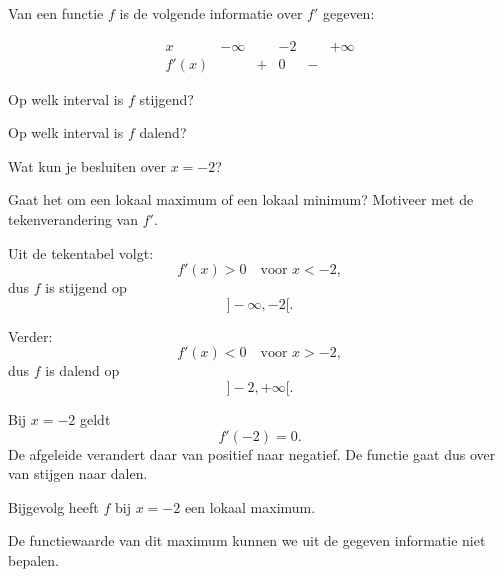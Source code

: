 \documentclass{ximera}
\begin{document}
\begin{oefening}{\oefB\ESS}

Van een functie $f$ is de volgende informatie over $f'$ gegeven:

\[
\begin{array}{c|ccccc}
x      & -\infty &   & -2 &   & +\infty \\ \hline
f'(x)  &         & + & 0  & - &
\end{array}
\]

\begin{question}
Op welk interval is $f$ stijgend?
\end{question}

\begin{question}
Op welk interval is $f$ dalend?
\end{question}

\begin{question}
Wat kun je besluiten over $x=-2$?
\end{question}

\begin{question}
Gaat het om een lokaal maximum of een lokaal minimum?
Motiveer met de tekenverandering van $f'$.
\end{question}

\begin{oplossing}

Uit de tekentabel volgt:
\[
f'(x)>0 \quad \text{voor } x<-2,
\]
dus $f$ is stijgend op
\[
]-\infty,-2[.
\]

Verder:
\[
f'(x)<0 \quad \text{voor } x>-2,
\]
dus $f$ is dalend op
\[
]-2,+\infty[.
\]

Bij $x=-2$ geldt
\[
f'(-2)=0.
\]
De afgeleide verandert daar van positief naar negatief. De functie gaat
dus over van stijgen naar dalen.

Bijgevolg heeft $f$ bij $x=-2$ een lokaal maximum.

De functiewaarde van dit maximum kunnen we uit de gegeven informatie niet
bepalen.

\end{oplossing}

\end{oefening}


\end{document}

